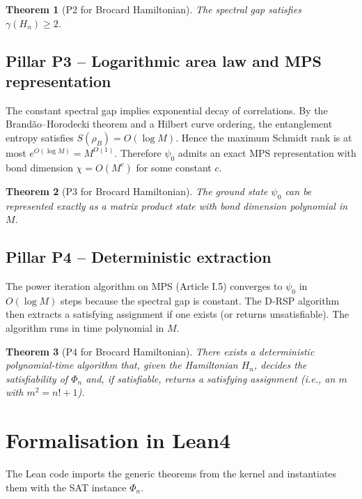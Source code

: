 \documentclass[11pt,a4paper]{article}
\newtheorem{theorem}{Theorem}[section]
\begin{document}
\begin{theorem}[P2 for Brocard Hamiltonian]
The spectral gap satisfies $\gamma(H_n) \ge 2$.
\end{theorem}

\subsection{Pillar P3 – Logarithmic area law and MPS representation}
The constant spectral gap implies exponential decay of correlations. By the Brandão–Horodecki theorem and a Hilbert curve ordering, the entanglement entropy satisfies $S(\rho_B) = O(\log M)$. Hence the maximum Schmidt rank is at most $e^{O(\log M)} = M^{O(1)}$. Therefore $\psi_0$ admits an exact MPS representation with bond dimension $\chi = O(M^c)$ for some constant $c$.

\begin{theorem}[P3 for Brocard Hamiltonian]
The ground state $\psi_0$ can be represented exactly as a matrix product state with bond dimension polynomial in $M$.
\end{theorem}

\subsection{Pillar P4 – Deterministic extraction}
The power iteration algorithm on MPS (Article I.5) converges to $\psi_0$ in $O(\log M)$ steps because the spectral gap is constant. The D‑RSP algorithm then extracts a satisfying assignment if one exists (or returns unsatisfiable). The algorithm runs in time polynomial in $M$.

\begin{theorem}[P4 for Brocard Hamiltonian]
There exists a deterministic polynomial‑time algorithm that, given the Hamiltonian $H_n$, decides the satisfiability of $\Phi_n$ and, if satisfiable, returns a satisfying assignment (i.e., an $m$ with $m^2 = n!+1$).
\end{theorem}

\section{Formalisation in Lean4}

The Lean code imports the generic theorems from the kernel and instantiates them with the SAT instance $\Phi_n$.
\end{document}
